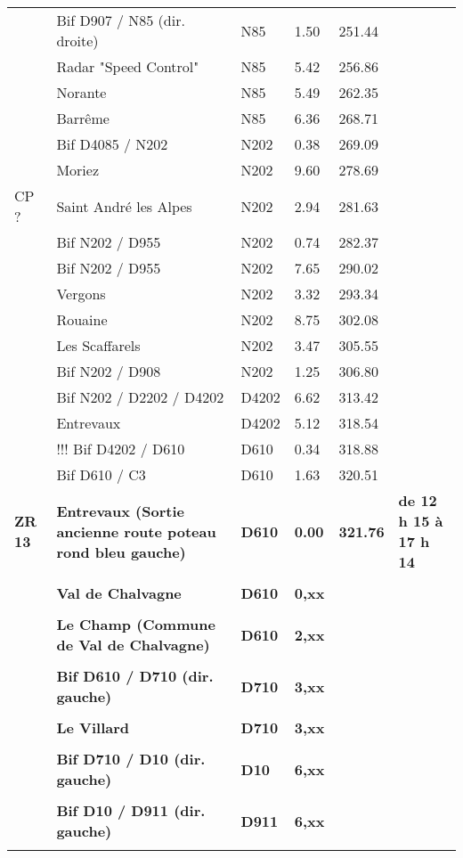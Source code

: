 \documentclass{article}%
\begin{document}
\begin{longtable}{p{2.25cm}|p{6.7cm}|p{2.0cm}|p{1.5cm}|p{1.5cm}|p{3.5cm}}
 &Bif D907 / N85 (dir. droite)&N85&1.50&251.44& \\%
 &Radar "Speed Control"&N85&5.42&256.86& \\%
 &Norante&N85&5.49&262.35& \\%
 &Barrême&N85&6.36&268.71& \\%
 &Bif D4085 / N202&N202&0.38&269.09& \\%
 &Moriez&N202&9.60&278.69& \\%
CP ? &Saint André les Alpes&N202&2.94&281.63& \\%
 &Bif N202 / D955&N202&0.74&282.37& \\%
 &Bif N202 / D955&N202&7.65&290.02& \\%
 &Vergons&N202&3.32&293.34& \\%
 &Rouaine&N202&8.75&302.08& \\%
 &Les Scaffarels&N202&3.47&305.55& \\%
 &Bif N202 / D908&N202&1.25&306.80& \\%
 &Bif N202 / D2202 / D4202&D4202&6.62&313.42& \\%
 &Entrevaux &D4202&5.12&318.54& \\%
 &!!! Bif D4202 / D610&D610&0.34&318.88& \\%
 &Bif D610 / C3 &D610&1.63&320.51& \\%
\textbf{ZR 13}&\textbf{Entrevaux (Sortie ancienne route poteau rond bleu gauche)}&\textbf{D610}&\textbf{0.00}&\textbf{321.76}&\textbf{de 12 h 15 à 17 h 14}\\%
 & & & & & \\%
 &\textbf{Val de Chalvagne}&\textbf{D610 }&\textbf{0,xx}& & \\%
 & & & & & \\%
 &\textbf{Le Champ (Commune de Val de Chalvagne)}&\textbf{D610}&\textbf{2,xx}& & \\%
 & & & & & \\%
 &\textbf{Bif D610 / D710 (dir. gauche)}&\textbf{D710}&\textbf{3,xx}& & \\%
 & & & & & \\%
 &\textbf{Le Villard}&\textbf{D710}&\textbf{3,xx}& & \\%
 & & & & & \\%
 &\textbf{Bif D710 / D10 (dir. gauche)}&\textbf{D10}&\textbf{6,xx}& & \\%
 & & & & & \\%
 &\textbf{Bif D10  / D911  (dir. gauche)}&\textbf{D911 }&\textbf{6,xx}& & \\%
 & & & & & \\%

\end{longtable}
\end{document}
